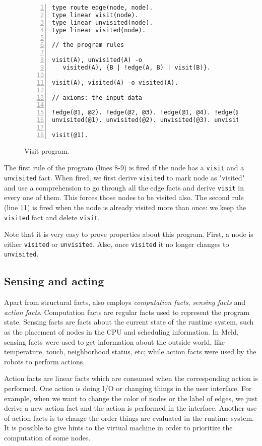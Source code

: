 \begin{figure}[h!]
\small\begin{Verbatim}[numbers=left]
type route edge(node, node).
type linear visit(node).
type linear unvisited(node).
type linear visited(node).

// the program rules

visit(A), unvisited(A) -o
   visited(A), {B | !edge(A, B) | visit(B)}.

visit(A), visited(A) -o visited(A).

// axioms: the input data

!edge(@1, @2). !edge(@2, @3). !edge(@1, @4). !edge(@2, @4).
unvisited(@1). unvisited(@2). unvisited(@3). unvisited(@4).

visit(@1).
\end{Verbatim}
  \caption{Visit program.}
  \label{code:visit}
\end{figure}
\normalsize

The first rule of the program (lines 8-9) is fired if the node has a \texttt{visit} and a \texttt{unvisited} fact. When fired, we first derive \texttt{visited} to mark node as "visited" and use a
comprehension to go through all the edge facts and derive \texttt{visit} in every one of them.
This forces those nodes to be visited also. The second rule (line 11) is fired when the node is already
visited more than once: we keep the \texttt{visited} fact and delete \texttt{visit}.

Note that it is very easy to prove properties about this program. First, a node is either
\texttt{visited} or \texttt{unvisited}. Also, once \texttt{visited} it no longer changes to
\texttt{unvisited}.

\subsection{Sensing and acting}

Apart from structural facts, \lang also employs \emph{computation facts}, \emph{sensing facts}
and \emph{action facts}.
Computation facts are regular facts used to represent the program state.
Sensing facts are facts about the current state of the runtime system, such as the placement
of nodes in the CPU and scheduling information. In Meld, sensing facts
were used to get information about the outside world, like temperature, touch, neighborhood status,
etc; while action facts were used by the robots to perform actions.

Action facts are linear facts which are consumed when the corresponding action is performed.
One action is doing I/O or changing things
in the user interface. For example, when we want to change the color of nodes or the label
of edges, we just derive a new action fact and the action is performed in the interface.
Another use of action facts is to change the order things are evaluated in the runtime system.
It is possible to give hints to the virtual machine in order to prioritize the computation of
some nodes.

